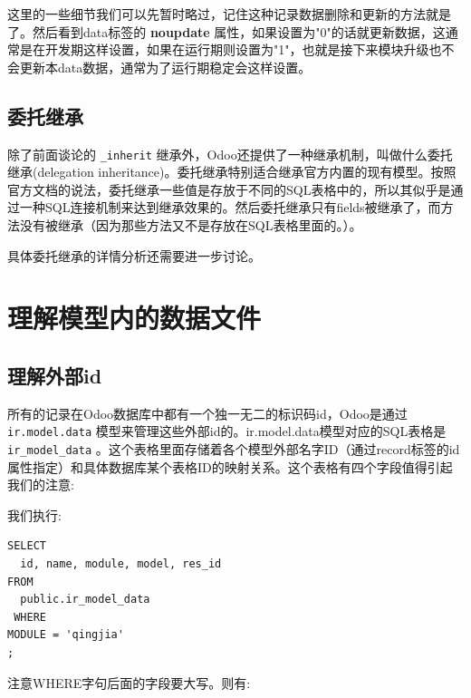 \documentclass[11pt,a4paper]{sphinxmanual}
\begin{document}
这里的一些细节我们可以先暂时略过，记住这种记录数据删除和更新的方法就是了。然后看到data标签的 \textbf{noupdate} 属性，如果设置为"0"的话就更新数据，这通常是在开发期这样设置，如果在运行期则设置为"1"，也就是接下来模块升级也不会更新本data数据，通常为了运行期稳定会这样设置。


\section{委托继承}
\label{sec-8-7}
除了前面谈论的 \verb~_inherit~ 继承外，Odoo还提供了一种继承机制，叫做什么委托继承(delegation inheritance)。委托继承特别适合继承官方内置的现有模型。按照官方文档的说法，委托继承一些值是存放于不同的SQL表格中的，所以其似乎是通过一种SQL连接机制来达到继承效果的。然后委托继承只有fields被继承了，而方法没有被继承（因为那些方法又不是存放在SQL表格里面的。）。

具体委托继承的详情分析还需要进一步讨论。



\chapter{理解模型内的数据文件}
\label{sec-9}
\section{理解外部id}
\label{sec-9-1}
所有的记录在Odoo数据库中都有一个独一无二的标识码id，Odoo是通过 \verb~ir.model.data~ 模型来管理这些外部id的。ir.model.data模型对应的SQL表格是 \verb~ir_model_data~ 。这个表格里面存储着各个模型外部名字ID（通过record标签的id属性指定）和具体数据库某个表格ID的映射关系。这个表格有四个字段值得引起我们的注意:

我们执行:
\begin{Verbatim}
SELECT 
  id, name, module, model, res_id
FROM 
  public.ir_model_data
 WHERE
MODULE = 'qingjia'
;
\end{Verbatim}

注意WHERE字句后面的字段要大写。则有:
\end{document}
